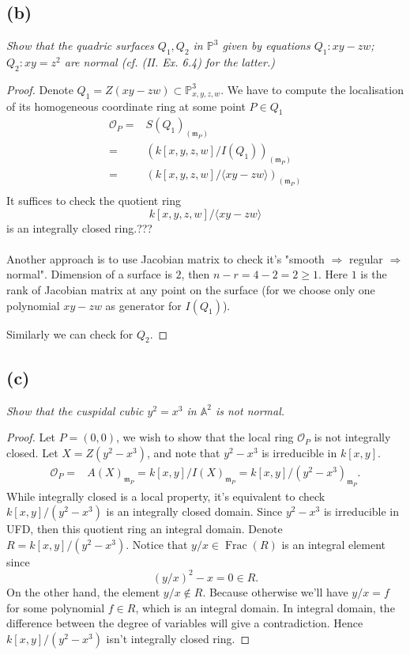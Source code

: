 \subsection{(b)}
\textit{Show that the quadric surfaces $Q_1,Q_2$ in $\mathbb P^3$ given by equations $Q_1: xy-zw$; $Q_2:xy=z^2$ are normal (cf. (II. Ex. 6.4) for the latter.)}

\begin{proof}
	Denote $Q_1=Z(xy-zw)\subset \mathbb P^3_{x,y,z,w}$. We have to compute the localisation of its homogeneous coordinate ring at some point $P\in Q_1$
	\begin{align*}
		\mathscr O_P =& S(Q_1)_{(\mathfrak m_P)}\\
		=& (k[x,y,z,w]/I(Q_1))_{(\mathfrak m_P)}\\
		=& (k[x,y,z,w]/\langle xy-zw\rangle)_{(\mathfrak m_P)}\\
	\end{align*}
	It suffices to check the quotient ring
	\[k[x,y,z,w]/\langle xy-zw\rangle \] is an integrally closed ring.???\\\\

	Another approach is to use Jacobian matrix to check it's "smooth $\Rightarrow$ regular $\Rightarrow$ normal". Dimension of a surface is $2$, then $n-r=4-2=2\geq 1$. Here $1$ is the rank of Jacobian matrix at any point on the surface (for we choose only one polynomial $xy-zw$ as generator for $I(Q_1)$). 

	Similarly we can check for $Q_2$.

\end{proof}

\subsection{(c)}
\textit{Show that the cuspidal cubic $y^2=x^3$ in $\mathbb A^2$ is not normal.}

\begin{proof}
	Let $P=(0,0)$, we wish to show that the local ring $\mathscr O_P$ is not integrally closed. Let $X=Z(y^2-x^3)$, and note that $y^2-x^3$ is irreducible in $k[x,y]$.
	\begin{align*}
		\mathscr O_P =& A(X)_{\mathfrak m_P} = k[x,y]/I(X)_{\mathfrak m_P}=k[x,y]/(y^2-x^3)_{\mathfrak m_P}.
	\end{align*}
	While integrally closed is a local property, it's equivalent to check $k[x,y]/(y^2-x^3)$ is an integrally closed domain. Since $y^2-x^3$ is irreducible in UFD, then this quotient ring an integral domain. Denote $R=k[x,y]/(y^2-x^3)$. Notice that $y/x\in \operatorname{Frac}(R)$ is an integral element since 
	\[(y/x)^2-x=0\in R.\] On the other hand, the element $y/x\notin R$. Because otherwise we'll have $y/x=f$ for some polynomial $f\in R$, which is an integral domain. In integral domain, the difference between the degree of variables will give a contradiction. Hence $k[x,y]/(y^2-x^3)$ isn't integrally closed ring.
\end{proof}

